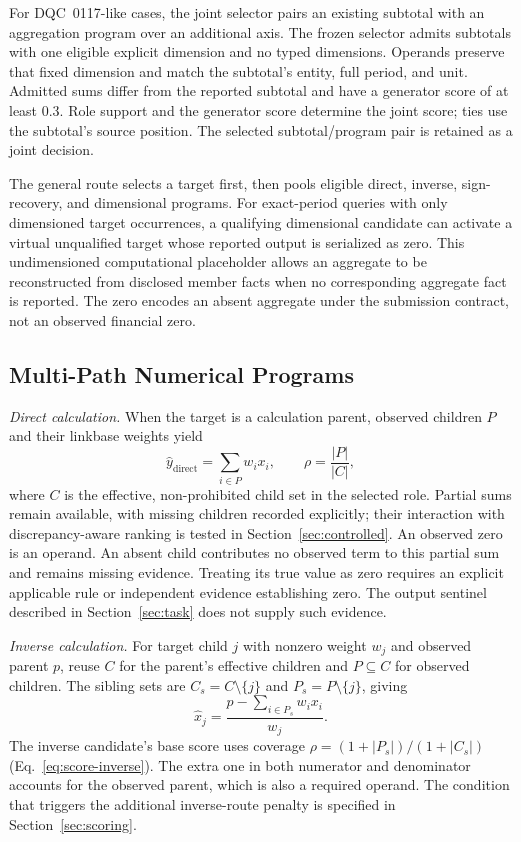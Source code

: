 \documentclass[conference]{IEEEtran}
\begin{document}
For DQC~0117-like cases, the joint selector pairs an existing subtotal with an aggregation program over an additional axis. The frozen selector admits subtotals with one eligible explicit dimension and no typed dimensions. Operands preserve that fixed dimension and match the subtotal's entity, full period, and unit. Admitted sums differ from the reported subtotal and have a generator score of at least 0.3. Role support and the generator score determine the joint score; ties use the subtotal's source position. The selected subtotal/program pair is retained as a joint decision.

The general route selects a target first, then pools eligible direct, inverse, sign-recovery, and dimensional programs. For exact-period queries with only dimensioned target occurrences, a qualifying dimensional candidate can activate a virtual unqualified target whose reported output is serialized as zero. This undimensioned computational placeholder allows an aggregate to be reconstructed from disclosed member facts when no corresponding aggregate fact is reported. The zero encodes an absent aggregate under the submission contract, not an observed financial zero. 

\subsection{Multi-Path Numerical Programs}
\label{sec:programs}

\textit{Direct calculation.} When the target is a calculation parent, observed children $P$ and their linkbase weights yield
\begin{equation}
\hat y_{\mathrm{direct}}=\sum_{i\in P}w_i x_i,
\qquad
\rho=\frac{|P|}{|C|},
\label{eq:direct}
\end{equation}
where $C$ is the effective, non-prohibited child set in the selected role. Partial sums remain available, with missing children recorded explicitly; their interaction with discrepancy-aware ranking is tested in Section~\ref{sec:controlled}. An observed zero is an operand. An absent child contributes no observed term to this partial sum and remains missing evidence. Treating its true value as zero requires an explicit applicable rule or independent evidence establishing zero. The output sentinel described in Section~\ref{sec:task} does not supply such evidence.

\textit{Inverse calculation.} For target child $j$ with nonzero weight $w_j$ and observed parent $p$, reuse $C$ for the parent's effective children and $P\subseteq C$ for observed children. The sibling sets are $C_s=C\setminus\{j\}$ and $P_s=P\setminus\{j\}$, giving
\begin{equation}
\hat x_j=\frac{p-\sum_{i\in P_s}w_i x_i}{w_j}.
\label{eq:inverse}
\end{equation}
The inverse candidate's base score uses coverage $\rho=(1+|P_s|)/(1+|C_s|)$ (Eq.~\eqref{eq:score-inverse}). The extra one in both numerator and denominator accounts for the observed parent, which is also a required operand. The condition that triggers the additional inverse-route penalty is specified in Section~\ref{sec:scoring}.
\end{document}
